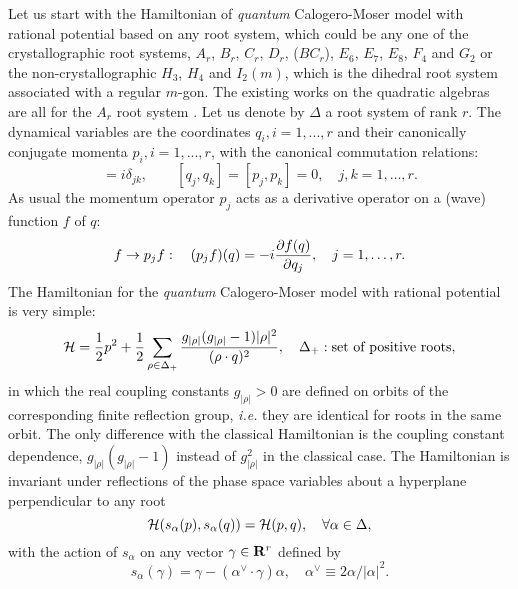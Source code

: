 \documentclass[a4paper,12pt]{article}
\begin{document}
Let us start with the Hamiltonian of {\em quantum} Calogero-Moser model
with rational potential based on any root system, which could be any
one of the crystallographic root systems, $A_{r}$, $B_{r}$, $C_{r}$,
$D_{r}$, ($BC_{r}$), $E_{6}$, $E_{7}$, $E_{8}$, $F_{4}$ and $G_{2}$
or the non-crystallographic $H_{3}$, $H_{4}$ and $I_2(m)$, which is the
dihedral root system associated with a regular $m$-gon.
The existing works on the quadratic algebras are all for the $A_{r}$
root system \cite{Kuz, UjWa, Gonera1}.
Let us denote by $\Delta$ a root system of rank $r$. The
dynamical variables are  the coordinates $q_{i},
i=1,...,r$ and their canonically conjugate momenta $p_{i},
i=1,...,r$,  with
the canonical commutation relations:
\begin{equation}
   [q_{j},p_{k}]=i\delta_{jk},\qquad [q_{j},q_{k}]=
   [p_{j},p_{k}]=0,\quad j,k=1,\ldots,r.
\end{equation}
As usual the momentum operator \(p_j\) acts as a derivative operator
on a (wave) function $f$ of $q$:
\[
  f\to p_jf: \quad (p_jf)(q)=-i{\partial f(q)\over{\partial q_j}},
  \quad j=1,\ldots,r.
\]
The Hamiltonian for the {\em quantum} Calogero-Moser model  with
rational potential is very simple:
\begin{equation}
    {\cal H}={1\over2}p^2+
    {1\over2}\sum_{\rho\in\Delta_+}
   {g_{|\rho|}(g_{|\rho|}-1)|\rho|^{2}\over{(\rho\cdot q)^2}},
   \quad \Delta_+: \mbox{set of positive roots},
   \label{ratHam}
\end{equation}
in which the real coupling constants \(g_{|\rho|}>0\) are
defined on orbits of the corresponding
finite reflection  group, {\it i.e.} they are
identical for roots in the same orbit.
The only difference with the classical Hamiltonian is the
coupling constant dependence, $g_{|\rho|}(g_{|\rho|}-1)$ instead of
$g_{|\rho|}^2$ in the classical case.
The Hamiltonian is invariant under reflections of the phase space
variables about a hyperplane perpendicular to any root
\begin{equation}
  {\cal H}(s_{\alpha}(p),s_{\alpha}(q))={\cal H}(p,q), \quad
   \forall\alpha\in\Delta,
  \label{HamCoxinv}
\end{equation}
with the action of \(s_{\alpha}\) on any vector
\(\gamma\in{\bf R}^r\) defined by
\begin{equation}
   \label{Root_reflection}
   s_{\alpha}(\gamma)=\gamma-(\alpha^{\vee}\!\!\cdot\gamma)\alpha,\quad
   \alpha^{\vee}\equiv2\alpha/|\alpha|^{2}.
\end{equation}
\end{document}
